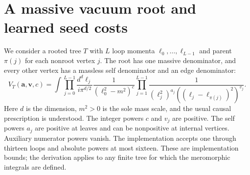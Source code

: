 \section{A massive vacuum root and learned seed costs}
\label{app:vac-ml}
We consider a rooted tree $T$ with $L$ loop momenta $\ell_0,\ldots,\ell_{L-1}$ and parent $\pi(j)$ for each nonroot vertex $j$. The root has one massive denominator, and every other vertex has a massless self denominator and an edge denominator:
\begin{equation}
 V_T(\mathbf a,\mathbf v,c)=
 \int\prod_{j=0}^{L-1}\frac{d^d\ell_j}{i\pi^{d/2}}
 \frac{1}{(\ell_0^2-m^2)^c}
 \prod_{j=1}^{L-1}\frac{1}{(\ell_j^2)^{a_j}
 ((\ell_j-\ell_{\pi(j)})^2)^{v_j}} .
 \label{eq:vac-ml-family}
\end{equation}
Here $d$ is the dimension, $m^2>0$ is the sole mass scale, and the usual causal prescription is understood. The integer powers $c$ and $v_j$ are positive. The self powers $a_j$ are positive at leaves and can be nonpositive at internal vertices. Auxiliary numerator powers vanish. The implementation accepts one through thirteen loops and absolute powers at most sixteen. These are implementation bounds; the derivation applies to any finite tree for which the meromorphic integrals are defined.

